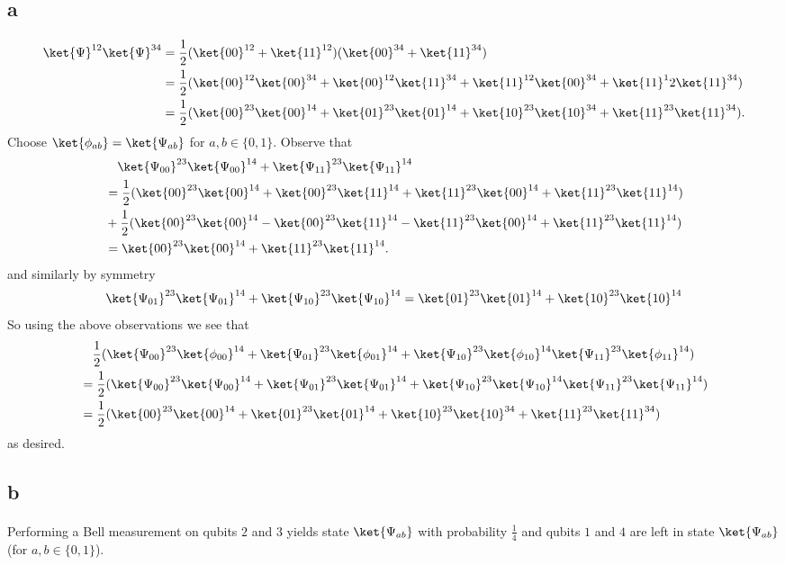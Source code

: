 \documentclass[letterpaper,12pt,oneside,onecolumn]{article}
\begin{document}
\section{}
\subsection{a}
\paragraph{}
\begin{align*}
\ket{\Psi}^{12}\ket{\Psi}^{34} &= \frac{1}{2}(\ket{00}^{12} + \ket{11}^{12})(\ket{00}^{34} + \ket{11}^{34}) \\
&= \frac{1}{2}(\ket{00}^{12}\ket{00}^{34} + \ket{00}^{12}\ket{11}^{34} + \ket{11}^{12}\ket{00}^{34} + \ket{11}^12\ket{11}^{34})\\
&= \frac{1}{2}(\ket{00}^{23}\ket{00}^{14} + \ket{01}^{23}\ket{01}^{14} + \ket{10}^{23}\ket{10}^{34} + \ket{11}^{23}\ket{11}^{34}).
\end{align*}
Choose $\ket{\phi_{ab}} = \ket{\Psi_{ab}}$ for $a,b \in \{0,1\}$. Observe that 
\begin{align*}
&\ \ \ \ket{\Psi_{00}}^{23}\ket{\Psi_{00}}^{14} + \ket{\Psi_{11}}^{23}\ket{\Psi_{11}}^{14} \\
&= \frac{1}{2}(\ket{00}^{23}\ket{00}^{14} + \ket{00}^{23}\ket{11}^{14} + \ket{11}^{23}\ket{00}^{14} + \ket{11}^{23}\ket{11}^{14}) \\
&+ \frac{1}{2}(\ket{00}^{23}\ket{00}^{14} - \ket{00}^{23}\ket{11}^{14} - \ket{11}^{23}\ket{00}^{14} + \ket{11}^{23}\ket{11}^{14}) \\
&= \ket{00}^{23}\ket{00}^{14} + \ket{11}^{23}\ket{11}^{14}.
\end{align*}
and similarly by symmetry
$$\ket{\Psi_{01}}^{23}\ket{\Psi_{01}}^{14} + \ket{\Psi_{10}}^{23}\ket{\Psi_{10}}^{14} = \ket{01}^{23}\ket{01}^{14} + \ket{10}^{23}\ket{10}^{14} $$
So using the above observations we see that
\begin{align*}
&\ \ \ \frac{1}{2}(\ket{\Psi_{00}}^{23}\ket{\phi_{00}}^{14} + \ket{\Psi_{01}}^{23}\ket{\phi_{01}}^{14} + \ket{\Psi_{10}}^{23}\ket{\phi_{10}}^{14} \ket{\Psi_{11}}^{23}\ket{\phi_{11}}^{14}) \\
&= \frac{1}{2}(\ket{\Psi_{00}}^{23}\ket{\Psi_{00}}^{14} + \ket{\Psi_{01}}^{23}\ket{\Psi_{01}}^{14} + \ket{\Psi_{10}}^{23}\ket{\Psi_{10}}^{14} \ket{\Psi_{11}}^{23}\ket{\Psi_{11}}^{14}) \\
&= \frac{1}{2}(\ket{00}^{23}\ket{00}^{14} + \ket{01}^{23}\ket{01}^{14} + \ket{10}^{23}\ket{10}^{34} + \ket{11}^{23}\ket{11}^{34})
\end{align*}
as desired.
\subsection{b}
\paragraph{}
Performing a Bell measurement on qubits $2$ and $3$ yields state $\ket{\Psi_{ab}}$ with probability $\frac{1}{4}$ and qubits $1$ and $4$ are left in state $\ket{\Psi_{ab}}$ (for $a,b \in\{0,1\}$).
\end{document}
